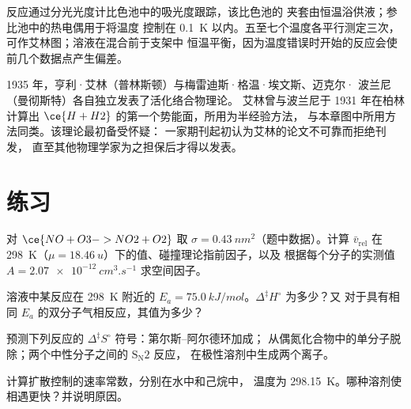 \begin{inthelab}[用于艾林研究的夹套比色池]
反应通过分光光度计比色池中的吸光度跟踪，该比色池的
夹套由恒温浴供液；参比池中的热电偶用于将温度
控制在 \qty{0.1}{K} 以内。五至七个温度各平行测定三次，
可作艾林图；溶液在混合前于支架中
恒温平衡，因为温度错误时开始的反应会使
前几个数据点产生偏差。
\end{inthelab}

\begin{history}[艾林、埃文斯与波兰尼，1935 年]
1935 年，亨利·艾林（普林斯顿）与梅雷迪斯·格温·埃文斯、迈克尔·
波兰尼（曼彻斯特）各自独立发表了活化络合物理论。
艾林曾与波兰尼于 1931 年在柏林计算出
$\ce{H + H2}$ 的第一个势能面，所用为半经验方法，
与本章图中所用方法同类。该理论最初备受怀疑：
一家期刊起初认为艾林的论文不可靠而拒绝刊发，
直至其他物理学家为之担保后才得以发表。
\end{history}

\section{练习}

\begin{exercise}[$\star$]\label{exo:b3:rate-theories:1}
对 $\ce{NO + O3 -> NO2 + O2}$ 取 $\sigma = \qty{0.43}{nm^2}$（题中数据）。计算 $\bar v_{\mathrm{rel}}$
在 \qty{298}{K}（$\mu = \qty{18.46}{u}$）下的值、碰撞理论指前因子，以及
根据每个分子的实测值 $A = \qty{2.07e-12}{cm^3.s^{-1}}$ 求空间因子。
\end{exercise}

\begin{exercise}[$\star$]\label{exo:b3:rate-theories:2}
溶液中某反应在 \qty{298}{K} 附近的 $E_a = \qty{75.0}{kJ/mol}$。$\Delta^{\ddagger}H^\circ$ 为多少？又
对于具有相同 $E_a$ 的双分子气相反应，其值为多少？
\end{exercise}

\begin{exercise}[$\star$]\label{exo:b3:rate-theories:3}
预测下列反应的 $\Delta^{\ddagger}S^\circ$ 符号：第尔斯–阿尔德环加成；
 从偶氮化合物中的单分子脱除；两个中性分子之间的 $\mathrm{S_N2}$ 反应，
在极性溶剂中生成两个离子。
\end{exercise}

\begin{exercise}[$\star$]\label{exo:b3:rate-theories:4}
计算扩散控制的速率常数，分别在水中和己烷中，
温度为 \qty{298.15}{K}。哪种溶剂使相遇更快？并说明原因。
\end{exercise}

